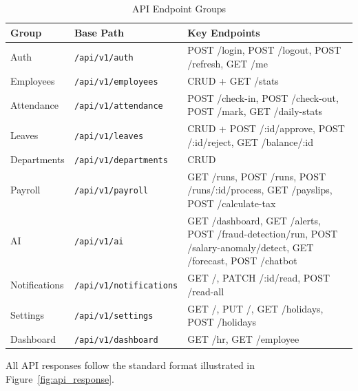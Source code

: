 \documentclass[12pt,a4paper]{report}
\begin{document}
\begin{table}[H]
\centering
\caption{API Endpoint Groups}
\label{tab:api_groups}
\begin{tabular}{|l|l|p{7cm}|}
\hline
\textbf{Group} & \textbf{Base Path} & \textbf{Key Endpoints} \\
\hline
Auth          & \texttt{/api/v1/auth}        & POST /login, POST /logout, POST /refresh, GET /me \\
\hline
Employees     & \texttt{/api/v1/employees}   & CRUD + GET /stats \\
\hline
Attendance    & \texttt{/api/v1/attendance}  & POST /check-in, POST /check-out, POST /mark, GET /daily-stats \\
\hline
Leaves        & \texttt{/api/v1/leaves}      & CRUD + POST /:id/approve, POST /:id/reject, GET /balance/:id \\
\hline
Departments   & \texttt{/api/v1/departments} & CRUD \\
\hline
Payroll       & \texttt{/api/v1/payroll}     & GET /runs, POST /runs, POST /runs/:id/process, GET /payslips, POST /calculate-tax \\
\hline
AI            & \texttt{/api/v1/ai}          & GET /dashboard, GET /alerts, POST /fraud-detection/run, POST /salary-anomaly/detect, GET /forecast, POST /chatbot \\
\hline
Notifications & \texttt{/api/v1/notifications} & GET /, PATCH /:id/read, POST /read-all \\
\hline
Settings      & \texttt{/api/v1/settings}    & GET /, PUT /, GET /holidays, POST /holidays \\
\hline
Dashboard     & \texttt{/api/v1/dashboard}   & GET /hr, GET /employee \\
\hline
\end{tabular}
\end{table}

All API responses follow the standard format illustrated in Figure~\ref{fig:api_response}.
\end{document}
